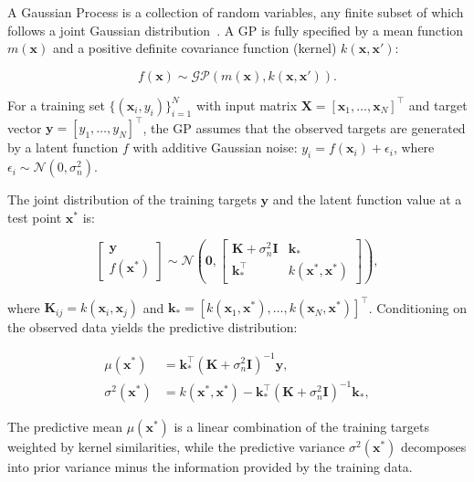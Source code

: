 \documentclass[conference]{IEEEtran}
\begin{document}
A Gaussian Process is a collection of random variables, any finite subset of which follows a joint Gaussian distribution~\cite{rasmussen2006}. A GP is fully specified by a mean function $m(\mathbf{x})$ and a positive definite covariance function (kernel) $k(\mathbf{x}, \mathbf{x}')$:

\begin{equation}
f(\mathbf{x}) \sim \mathcal{GP}(m(\mathbf{x}), k(\mathbf{x}, \mathbf{x}')).
\label{eq:gp_def}
\end{equation}

For a training set $\{(\mathbf{x}_i, y_i)\}_{i=1}^N$ with input matrix $\mathbf{X} = [\mathbf{x}_1, \dots, \mathbf{x}_N]^\top$ and target vector $\mathbf{y} = [y_1, \dots, y_N]^\top$, the GP assumes that the observed targets are generated by a latent function $f$ with additive Gaussian noise: $y_i = f(\mathbf{x}_i) + \epsilon_i$, where $\epsilon_i \sim \mathcal{N}(0, \sigma_n^2)$.

The joint distribution of the training targets $\mathbf{y}$ and the latent function value at a test point $\mathbf{x}^*$ is:

\begin{equation}
\begin{bmatrix} \mathbf{y} \\ f(\mathbf{x}^*) \end{bmatrix} \sim
\mathcal{N}\!\left(\mathbf{0}, \begin{bmatrix}
\mathbf{K} + \sigma_n^2 \mathbf{I} & \mathbf{k}_* \\
\mathbf{k}_*^\top & k(\mathbf{x}^*, \mathbf{x}^*)
\end{bmatrix}\right),
\label{eq:joint}
\end{equation}

where $\mathbf{K}_{ij} = k(\mathbf{x}_i, \mathbf{x}_j)$ and $\mathbf{k}_* = [k(\mathbf{x}_1, \mathbf{x}^*), \dots, k(\mathbf{x}_N, \mathbf{x}^*)]^\top$. Conditioning on the observed data yields the predictive distribution:

\begin{align}
\mu(\mathbf{x}^*) &= \mathbf{k}_*^\top (\mathbf{K} + \sigma_n^2 \mathbf{I})^{-1} \mathbf{y}, \label{eq:gp_mean}\\
\sigma^2(\mathbf{x}^*) &= k(\mathbf{x}^*, \mathbf{x}^*) - \mathbf{k}_*^\top (\mathbf{K} + \sigma_n^2 \mathbf{I})^{-1} \mathbf{k}_*, \label{eq:gp_var}
\end{align}

The predictive mean $\mu(\mathbf{x}^*)$ is a linear combination of the training targets weighted by kernel similarities, while the predictive variance $\sigma^2(\mathbf{x}^*)$ decomposes into prior variance minus the information provided by the training data.
\end{document}
